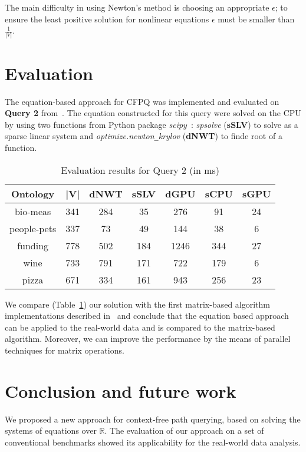 \documentclass[sigconf]{acmart}
\begin{document}
The main difficulty in using Newton's method is choosing an appropriate $\epsilon$; to ensure the least positive solution for nonlinear equations $\epsilon$ must be smaller than $\frac{1}{|V|}$.


\section{Evaluation}

The equation-based approach for CFPQ was implemented and evaluated on \textbf{Query 2} from~\cite{azimov2018context}.
The equation constructed for this query were solved on the CPU by using two functions from Python package \textit{scipy}~\cite{scipy}:
\textit{spsolve} (\textbf{sSLV}) to solve as a sparse linear system
and
\textit{optimize.newton\texttt{\_}krylov} (\textbf{dNWT}) to finde root of a function.

\begin{table}[h]
\centering
\caption{Evaluation results for Query 2 (in ms)}
\label{tbl2}
\begin{tabular}{ | c | c || c | c || c | c | c |}
\hline
Ontology    & |V| & dNWT & sSLV & dGPU & sCPU &  sGPU \\
\hline
\hline
bio-meas    & 341 &  284 & 35   & 276  & 91  & 24\\
people-pets & 337 &  73  & 49   & 144  & 38  & 6\\
funding     & 778 &  502 & 184  & 1246 & 344 & 27\\
wine        & 733 &  791 & 171  & 722  & 179 & 6\\
pizza       & 671 &  334 & 161  & 943  & 256 & 23\\
\hline
\end{tabular}

\end{table}

We compare (Table~\ref{tbl2}) our solution with the first matrix-based algorithm implementations described in~\cite{azimov2018context} and conclude that the equation based approach can be applied to the real-world data and is compared to the matrix-based algorithm.
Moreover, we can improve the performance by the means of parallel techniques for matrix operations.

\section{Conclusion and future work}

We proposed a new approach for context-free path querying, based on solving the systems of equations over $\mathbb{R}$.
The evaluation of our approach on a set of conventional benchmarks showed its applicability for the real-world data analysis.
\end{document}
